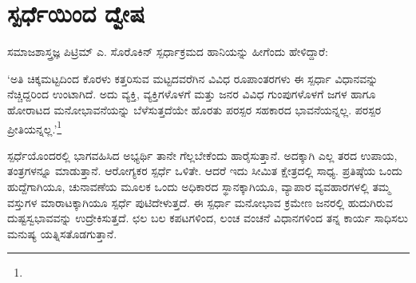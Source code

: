 \section*{ಸ್ಪರ್ಧೆಯಿಂದ ದ್ವೇಷ}


ಸಮಾಜಶಾಸ್ತ್ರಜ್ಞ ಪಿಟ್ರಿಮ್ ಎ. ಸೊರೊಕಿನ್ ಸ್ಪರ್ಧಾಕ್ರಮದ ಹಾನಿಯನ್ನು ಹೀಗೆಂದು ಹೇಳಿದ್ದಾರೆ:

‘ಅತಿ ಚಿಕ್ಕಮಟ್ಟದಿಂದ ಕೊರಳು ಕತ್ತರಿಸುವ ಮಟ್ಟದವರೆಗಿನ ವಿವಿಧ ರೂಪಾಂತರಗಳು ಈ ಸ್ಪರ್ಧಾ ವಿಧಾನವನ್ನು ನೆಚ್ಚಿದ್ದರಿಂದ ಉಂಟಾಗಿದೆ. ಅದು ವ್ಯಕ್ತಿ, ವ್ಯಕ್ತಿಗಳೊಳಗೆ ಮತ್ತು ಜನರ ವಿವಿಧ ಗುಂಪುಗಳೊಳಗೆ ಜಗಳ ಹಾಗೂ ಹೋರಾಟದ ಮನೋಭಾವನೆಯನ್ನು ಬೆಳೆಸುತ್ತದೆಯೇ ಹೊರತು ಪರಸ್ಪರ ಸಹಕಾರದ ಭಾವನೆಯನ್ನಲ್ಲ. ಪರಸ್ಪರ ಪ್ರೀತಿಯನ್ನಲ್ಲ.’\footnote{\hfill{}}

ಸ್ಪರ್ಧೆಯೊಂದರಲ್ಲಿ ಭಾಗವಹಿಸಿದ ಅಭ್ಯರ್ಥಿ ತಾನೇ ಗೆಲ್ಲಬೇಕೆಂದು ಹಾರೈಸುತ್ತಾನೆ. ಅದಕ್ಕಾಗಿ ಎಲ್ಲ ತರದ ಉಪಾಯ, ತಂತ್ರಗಳನ್ನೂ ಮಾಡುತ್ತಾನೆ. ಆರೋಗ್ಯಕರ ಸ್ಪರ್ಧೆ ಒಳಿತೇ. ಆದರೆ ಇದು ಸೀಮಿತ ಕ್ಷೇತ್ರದಲ್ಲಿ ಸಾಧ್ಯ. ಪ್ರತಿಷ್ಠೆಯ ಒಂದು ಹುದ್ದೆಗಾಗಿಯೂ, ಚುನಾವಣೆಯ ಮೂಲಕ ಒಂದು ಅಧಿಕಾರದ ಸ್ಥಾನಕ್ಕಾಗಿಯೂ, ವ್ಯಾಪಾರ ವ್ಯವಹಾರಗಳಲ್ಲಿ ತಮ್ಮ ವಸ್ತುಗಳ ಮಾರಾಟಕ್ಕಾಗಿಯೂ ಸ್ಪರ್ಧೆ ಪುಟಿದೇಳುತ್ತದೆ. ಈ ಸ್ಪರ್ಧಾ ಮನೋಭಾವ ಕ್ರಮೇಣ ಜನರಲ್ಲಿ ಹುದುಗಿರುವ ದುಷ್ಟಸ್ವಭಾವವನ್ನು ಉದ್ರೇಕಿಸುತ್ತದೆ. ಛಲ ಬಲ ಕಪಟಗಳಿಂದ, ಲಂಚ ವಂಚನೆ ವಿಧಾನಗಳಿಂದ ತನ್ನ ಕಾರ್ಯ ಸಾಧಿಸಲು ಮನುಷ್ಯ ಯತ್ನಿಸತೊಡಗುತ್ತಾನೆ.

